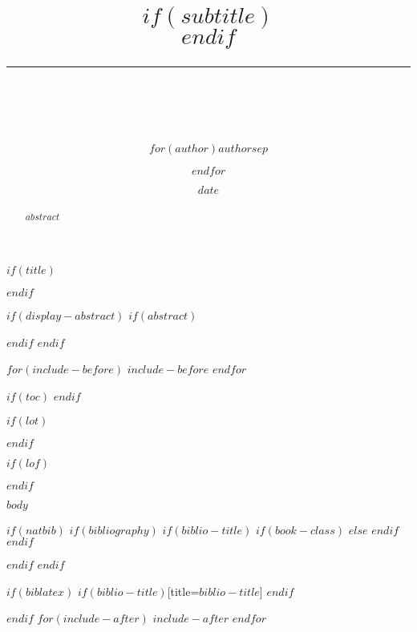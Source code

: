 \documentclass[$if(fontsize)$$fontsize$,$endif$$if(papersize)$$papersize$,$endif$$for(classoption)$$classoption$$sep$,$endfor$]{$documentclass$}
\title{\flushright {\textcolor{rule-color}{\rule{\textwidth}{2pt}}\vspace{0.4em}\\ \bf \huge $title$}$if(subtitle)$\\\vspace{0.2em}{\Large\textcolor{subtitle-color}{$subtitle$}}$endif$ \\ \vspace{-.4em} \textcolor{rule-color}{\rule{\textwidth}{2pt}} \\ \vspace{1.5em}}
\author{$for(author)$$author$$sep$ \and $endfor$}
\author{{\bf $for(author)$$author$$sep$ \and $endfor$}}
\affil{\textit{$institute$} $if(contact)$\\ \vspace{1.0em} \normalsize Contact: \href{mailto:$contact$}{$contact$}$endif$}
\date{$date$}
\renewcommand{\href}[2]{#2\footnote{\url{#1}}}
\begin{document}
\renewcommand{\labelitemi}{\textbullet}
\renewcommand{\labelitemii}\textendash{}
\renewcommand{\labelitemiii}{\textasteriskcentered}
\renewcommand{\labelitemiii}{\textperiodcentered}





$if(title)$
{
 \thispagestyle{empty}
 \maketitle
}
$endif$

$if(display-abstract)$
$if(abstract)$
\begin{abstract}
  $abstract$
\end{abstract}
$endif$
$endif$

$for(include-before)$
$include-before$
$endfor$

$if(toc)$
{
  \setcounter{tocdepth}{$toc-depth$}
  \tableofcontents
  \newpage
}
$endif$

$if(lot)$
\listoftables
\newpage
$endif$

$if(lof)$
\listoffigures
\newpage
$endif$

$body$

$if(natbib)$
$if(bibliography)$
$if(biblio-title)$
$if(book-class)$
\renewcommand\bibname{$biblio-title$}
$else$
\renewcommand\refname{$biblio-title$}
$endif$
$endif$

$endif$
$endif$

$if(biblatex)$
\printbibliography$if(biblio-title)$[title=$biblio-title$]
$endif$

$endif$
$for(include-after)$
$include-after$
$endfor$
\end{document}
